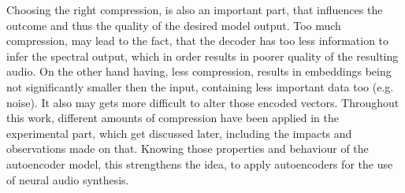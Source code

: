 Choosing the right compression, is also an important part, that influences the outcome and thus the quality of the desired model output. Too much compression, may lead to the fact, that the decoder has too less information to infer the spectral output, which in order results in poorer quality of the resulting audio. On the other hand having, less compression, results in embeddings being not significantly smaller then the input, containing less important data too (e.g. noise). It also may gets more difficult to alter those encoded vectors. Throughout this work, different amounts of compression have been applied in the experimental part, which get discussed later, including the impacts and observations made on that. Knowing those properties and behaviour of the autoencoder model, this strengthens the idea, to apply autoencoders for the use of neural audio synthesis.\\


